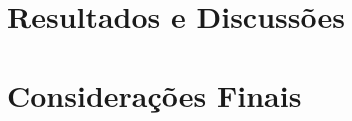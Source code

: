 \documentclass[
	12pt,				%
	openright,			%
	oneside,      %
	a4paper,			%
	english,			%
	french,				%
	spanish,			%
	brazil,				%
	]{abntex2}\usepackage[]{graphicx}\usepackage[table]{xcolor}
\theoremstyle{definition}
\begin{document}
\chapter{Resultados e Discussões}





\chapter{Considerações Finais}






%
%


\end{document}
